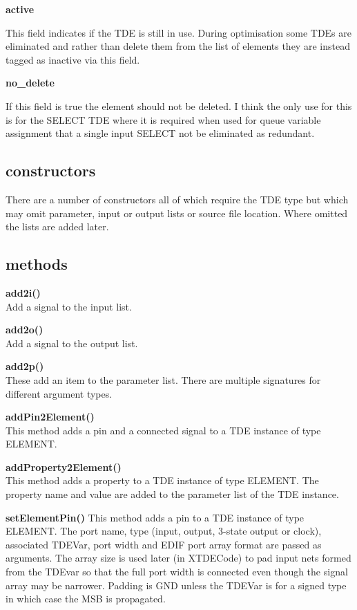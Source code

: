 {\bf active}

This field indicates if the TDE is still in use.
During optimisation some TDEs are eliminated
and rather than delete them from the list of elements they
are instead tagged as inactive via this field.

{\bf no\_delete}

If this field is true the element should not be deleted. I
think the only use for this is for the SELECT TDE where
it is required when used for queue variable assignment that
a single input SELECT not be eliminated as redundant.

\subsection{constructors}

    There are a number of constructors all of which require the
    TDE type but which may omit parameter, input or output lists
    or source file location. Where omitted the lists are added
    later.

\subsection{methods}


    {\bf add2i()} \\ Add a signal to the input list.

    {\bf add2o()} \\ Add a signal to the output list.

    {\bf add2p()} \\ These add an item to the parameter list. There are multiple
    signatures for different argument types.

    {\bf addPin2Element()} \\ This method adds a pin and a connected signal to a
    TDE instance of type ELEMENT.

    {\bf addProperty2Element()} \\ This method adds a property to a TDE instance
    of type ELEMENT. The property name and value are added to the parameter list
    of the TDE instance.

    {\bf setElementPin()} This method adds a pin to a TDE instance of type
    ELEMENT. The port name, type (input, output, 3-state output or clock),
    associated TDEVar, port width and EDIF port array format are passed as
    arguments. The array size is used later (in XTDECode) to pad input nets
    formed from the TDEvar so that the full port width is connected even though
    the signal array may be narrower. Padding is GND unless the TDEVar is for a
    signed type in which case the MSB is propagated.


